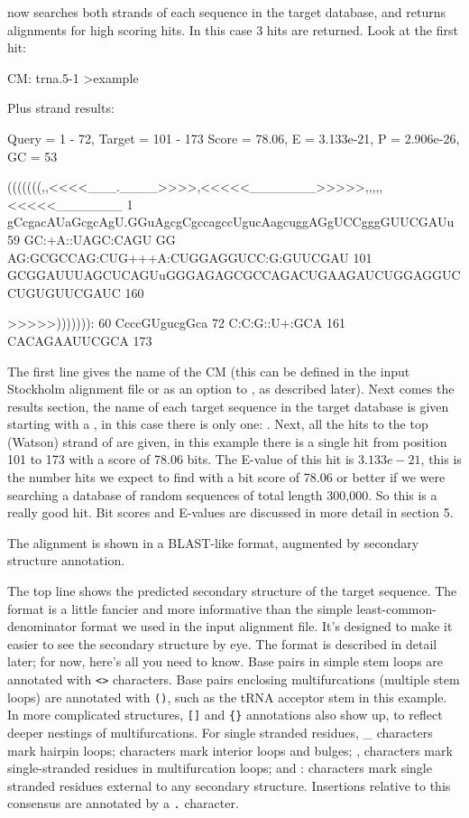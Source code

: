  now searches both strands of each sequence in the
target database, and returns alignments for high scoring hits.  In
this case 3 hits are returned. Look at the first hit:
\begin{sreoutput}
CM: trna.5-1
>example

  Plus strand results:

 Query = 1 - 72, Target = 101 - 173
 Score = 78.06, E = 3.133e-21, P = 2.906e-26, GC =  53

           (((((((,,<<<<___.____>>>>,<<<<<_______>>>>>,,,,,<<<<<_______
         1 gCcgacAUaGcgcAgU.GGuAgcgCgccagccUgucAagcuggAGgUCCgggGUUCGAUu 59      
           GC:+A::UAGC:CAGU GG AG:GCGCCAG:CUG+++A:CUGGAGGUCC:G:GUUCGAU 
       101 GCGGAUUUAGCUCAGUuGGGAGAGCGCCAGACUGAAGAUCUGGAGGUCCUGUGUUCGAUC 160     

           >>>>>))))))):
        60 CcccGUgucgGca 72      
           C:C:G::U+:GCA
       161 CACAGAAUUCGCA 173     

\end{sreoutput}

The first line gives the name of the CM (this can be defined in the
input Stockholm alignment file or as an option to , as
described later). Next comes the results section, the name of each
target sequence in the target database is given starting with a
\prog{$>$}, in this case there is only one: . Next, all
the hits to the top (Watson) strand of  are given, in
this example there is a single hit from position 101 to 173 with a
score of 78.06 bits. The E-value of this hit is $3.133e-21$, this is
the number hits we expect to find with a bit score of 78.06 or better
if we were searching a database of random sequences of total length
300,000. So this is a really good hit. Bit scores and E-values are
discussed in more detail in section 5.

The alignment is shown in a BLAST-like format, augmented by secondary
structure annotation. 

The top line shows the predicted secondary structure of the target
sequence. The format is a little fancier and more informative than the
simple least-common-denominator format we used in the input alignment
file. It's designed to make it easier to see the
secondary structure by eye. The format is described in detail later;
for now, here's all you need to know. Base pairs in simple stem loops
are annotated with \verb+<>+ characters. Base pairs enclosing
multifurcations (multiple stem loops) are annotated with \verb+()+,
such as the tRNA acceptor stem in this example. In more complicated
structures, \verb+[]+ and \verb+{}+ annotations also show up, to
reflect deeper nestings of multifurcations. For single stranded
residues, \_ characters mark hairpin loops; \- characters mark
interior loops and bulges; , characters mark single-stranded residues
in multifurcation loops; and : characters mark single stranded
residues external to any secondary structure. Insertions relative to
this consensus are annotated by a \verb+.+ character.

